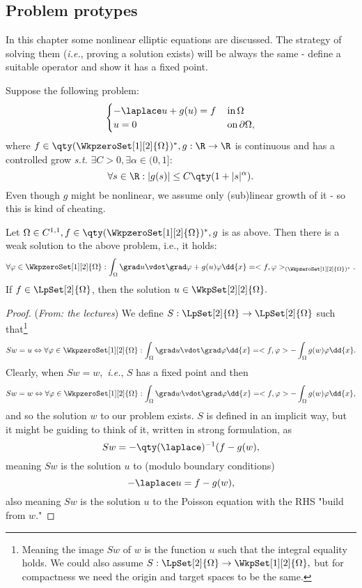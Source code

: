 \subsection{Problem protypes}
\label{sec:prototypes}

In this chapter some nonlinear elliptic equations are discussed. The strategy of solving them (\textit{i.e.}, proving a solution exists) will be always the same - define a suitable operator and show it has a fixed point.

\begin{example}
	Suppose the following problem: 
	\[
		\begin{cases}
			-\laplace u + g(u) = f & \, \text{in} \, \Omega\\
			u = 0 & \, \text{on} \, \partial \Omega,
		\end{cases}
	\]
	where $f \in \qty(\WkpzeroSet[1][2]{\Omega})^{*}, g: \R \to \R$ is continuous and has a controlled grow \textit{s.t.} $\exists C>0, \exists \alpha \in (0,1]$:
	\[
		\forall s \in \R: |g(s)|\leq C\qty(1+|s|^{\alpha}).
	\]
	Even though $g$ might be nonlinear, we assume only (sub)linear growth of it - so this is kind of cheating.

	\begin{theorem}[Existence]
		Let $ \Omega \in C^{1,1}, f \in \qty(\WkpzeroSet[1][2]{\Omega})^{*}, g$ is as above. Then there is a weak solution to the above problem, i.e., it holds:
		\[
			\forall \varphi \in \WkpzeroSet[1][2]{\Omega}: \int_{\Omega}\grad u \vdot \grad \varphi + g(u) \varphi\dd{x} = <f,\varphi>_{(\WkpzeroSet[1][2]{\Omega})^{*}}.
		\]
		If $f \in \LpSet[2]{\Omega}$, then the solution $u \in \WkpSet[2][2]{\Omega}.$
	\end{theorem}
	\begin{proof}(\textit{From: the lectures})
		We define $S: \LpSet[2]{\Omega} \to \LpSet[2]{\Omega}$ such that\footnote{Meaning the image $Sw$ of $w$ is the function $u$ such that the integral equality holds. We could also assume $S: \LpSet[2]{\Omega} \to \WkpSet[1][2]{\Omega},$ but for compactness we need the origin and target spaces to be the same.}
		\[
			Sw = u \Leftrightarrow \forall \varphi \in \WkpzeroSet[1][2]{\Omega}: \int_{\Omega}\grad u \vdot \grad \varphi\dd{x} = <f,\varphi> - \int_{\Omega}g(w) \varphi\dd{x}.
		\]
		Clearly, when $Sw = w,$ \textit{i.e.}, $S$ has a fixed point and then
		\[
			Sw = w \Leftrightarrow \forall \varphi \in \WkpzeroSet[1][2]{\Omega}: \int_{\Omega}\grad w \vdot \grad \varphi \dd{x} = <f, \varphi> - \int_{\Omega}g(w) \varphi\dd{x},
		\]
		and so the solution $w$ to our problem exists. $S$ is defined in an implicit way, but it might be guiding to think of it, written in strong formulation, as
		\[
			Sw = -\qty(\laplace)^{-1}(f - g(w),
		\]
		meaning $Sw$ is the solution $u$ to (modulo boundary conditions)
		\[
			-\laplace u = f- g(w),
		\]
		also meaning $Sw$ is the solution $u$ to the Poisson equation with the RHS "build from $w$."


\end{proof}
\end{example}

